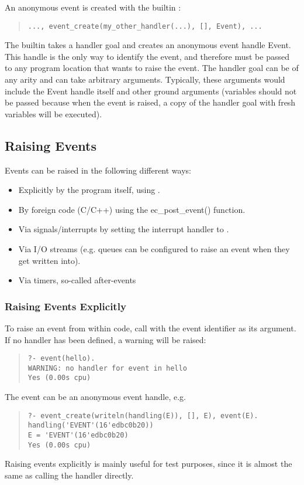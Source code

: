 An anonymous event is created with the builtin
:
\begin{quote}\begin{verbatim}
..., event_create(my_other_handler(...), [], Event), ...
\end{verbatim}\end{quote}
The builtin takes a handler goal and creates an anonymous event handle Event.
This handle is the only way to identify the event, and therefore must be
passed to any program location that wants to raise the event.
The handler goal can be of any arity and can take arbitrary arguments.
Typically, these arguments would include the Event handle itself and other
ground arguments (variables should not be passed because when the event
is raised, a copy of the handler goal with fresh variables will be executed).


\subsection{Raising Events}
Events can be raised in the following different ways:
\begin{itemize}
\item Explicitly by the {\eclipse} program itself, using
    .
\item By foreign code (C/C++) using the ec_post_event() function.
\item Via signals/interrupts by setting the interrupt handler to
    .
\item Via I/O streams (e.g. queues can be configured to raise an event
    when they get written into).
\item Via timers, so-called after-events
\end{itemize}

\subsubsection{Raising Events Explicitly}
To raise an event from within {\eclipse} code, call
 with the event
identifier as its argument. If no handler has been defined, a warning
will be raised:
\begin{quote}\begin{verbatim}
?- event(hello).
WARNING: no handler for event in hello
Yes (0.00s cpu)
\end{verbatim}\end{quote}
The event can be an anonymous event handle, e.g.
\begin{quote}\begin{verbatim}
?- event_create(writeln(handling(E)), [], E), event(E).
handling('EVENT'(16'edbc0b20))
E = 'EVENT'(16'edbc0b20)
Yes (0.00s cpu)
\end{verbatim}\end{quote}
Raising events explicitly is mainly useful for test purposes, since
it is almost the same as calling the handler directly.

